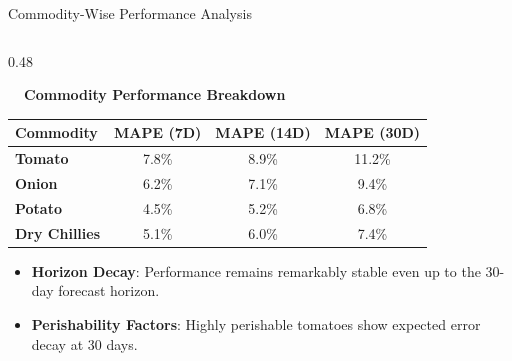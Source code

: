 \documentclass{beamer}
\begin{document}
\begin{frame}{Commodity-Wise Performance Analysis}
\vspace{-0.2cm}

\begin{columns}[T]
    \begin{column}{0.48\textwidth}
        \begin{smallcard}[0.98\textwidth, top=3pt, bottom=3pt, left=4pt, right=4pt, boxsep=0.5pt]
            \centering \textbf{\textcolor{primaryDark}{\small {}~~Commodity Performance Breakdown}}
            \vspace{0.08cm}
            \fontsize{6.5pt}{8pt}\selectfont
            \begin{table}
            \centering
            \begin{tabular}{l c c c}
                \toprule
                \textbf{Commodity} & \textbf{MAPE (7D)} & \textbf{MAPE (14D)} & \textbf{MAPE (30D)} \\
                \midrule
                \textbf{Tomato} & 7.8\% & 8.9\% & 11.2\% \\
                \textbf{Onion} & 6.2\% & 7.1\% & 9.4\% \\
                \textbf{Potato} & 4.5\% & 5.2\% & 6.8\% \\
                \textbf{Dry Chillies} & 5.1\% & 6.0\% & 7.4\% \\
                \bottomrule
            \end{tabular}
            \end{table}
            \vspace{0.1cm}
            \begin{itemize}\setlength\itemsep{2pt}\setlength\parskip{0pt}
                \item \textbf{Horizon Decay}: Performance remains remarkably stable even up to the 30-day forecast horizon.
                \item \textbf{Perishability Factors}: Highly perishable tomatoes show expected error decay at 30 days.
            \end{itemize}
        \end{smallcard}
    \end{column}
    

\end{columns}
\end{frame}
\end{document}
